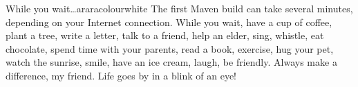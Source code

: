 \begin{messagebox}{While you wait\ldots}{araracolour}{\icok}{white}
The first Maven build can take several minutes, depending on your Internet connection. While you wait, have a cup of coffee, plant a tree, write a letter, talk to a friend, help an elder, sing, whistle, eat chocolate, spend time with your parents, read a book, exercise, hug your pet, watch the sunrise, smile, have an ice cream, laugh, be friendly. Always make a difference, my friend. Life goes by in a blink of an eye!
\end{messagebox}
